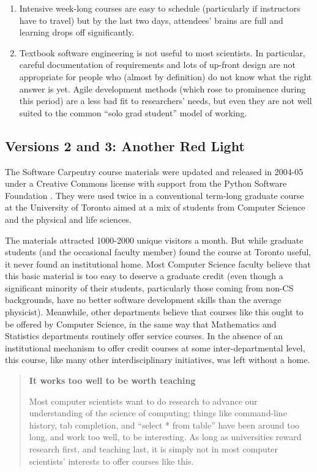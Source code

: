 \documentclass[10pt,a4paper,twocolumn]{article}
\begin{document}
\begin{enumerate}

\item
  Intensive week-long courses are easy to schedule (particularly if
  instructors have to travel) but by the last two days, attendees'
  brains are full and learning drops off significantly.

\item
  Textbook software engineering is not useful to most scientists. In
  particular, careful documentation of requirements and lots of
  up-front design are not appropriate for people who (almost by
  definition) do not know what the right answer is yet. Agile
  development methods (which rose to prominence during this period)
  are a less bad fit to researchers' needs, but even they are not well
  suited to the common ``solo grad student'' model of working.

\end{enumerate}

\subsection{Versions 2 and 3: Another Red Light}

The Software Carpentry course materials were updated and released in
2004-05 under a Creative Commons license with support from the
Python Software Foundation \cite{wilson2006b}. They were used twice in
a conventional term-long graduate course at the University of Toronto
aimed at a mix of students from Computer Science and the physical and
life sciences.

The materials attracted 1000-2000 unique visitors a month.  But while
graduate students (and the occasional faculty member) found the course
at Toronto useful, it never found an institutional home.  Most
Computer Science faculty believe that this basic material is too easy
to deserve a graduate credit (even though a significant minority of
their students, particularly those coming from non-CS backgrounds,
have no better software development skills than the average
physicist). Meanwhile, other departments believe that courses like
this ought to be offered by Computer Science, in the same way that
Mathematics and Statistics departments routinely offer service
courses.  In the absence of an institutional mechanism to offer credit
courses at some inter-departmental level, this course, like many other
interdisciplinary initiatives, was left without a home.

\begin{quote}
\textbf{It works too well to be worth teaching}

Most computer scientists want to do research to advance our
understanding of the science of computing; things like command-line
history, tab completion, and ``select * from table'' have been around
too long, and work too well, to be interesting. As long as
universities reward research first, and teaching last, it is simply
not in most computer scientists' interests to offer courses like this.
\end{quote}
\end{document}
